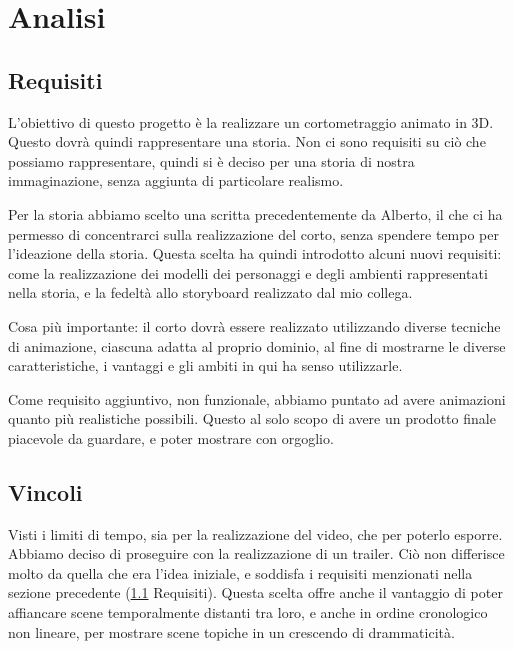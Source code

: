 
\chapter{Analisi} %

\label{Chapter2} %

\section{Requisiti} \label{req}
L'obiettivo di questo progetto è la realizzare un cortometraggio animato in 3D.
Questo dovrà quindi rappresentare una storia. Non ci sono requisiti su ciò che possiamo rappresentare, quindi si è deciso per una storia di nostra immaginazione, senza aggiunta di particolare realismo.

Per la storia abbiamo scelto una scritta precedentemente da Alberto, il che ci ha permesso di concentrarci sulla realizzazione del corto, senza spendere tempo per l'ideazione della storia. Questa scelta ha quindi introdotto alcuni nuovi requisiti: come la realizzazione dei modelli dei personaggi e degli ambienti rappresentati nella storia, e la fedeltà allo storyboard realizzato dal mio collega.

Cosa più importante: il corto dovrà essere realizzato utilizzando diverse tecniche di animazione, ciascuna adatta al proprio dominio, al fine di mostrarne le diverse caratteristiche, i vantaggi e gli ambiti in qui ha senso utilizzarle.

Come requisito aggiuntivo, non funzionale, abbiamo puntato ad avere animazioni quanto più realistiche possibili. Questo al solo scopo di avere un prodotto finale piacevole da guardare, e poter mostrare con orgoglio.

\section{Vincoli} 
Visti i limiti di tempo, sia per la realizzazione del video, che per poterlo esporre. Abbiamo deciso di proseguire con la realizzazione di un trailer. Ciò non differisce molto da quella che era l'idea iniziale, e soddisfa i requisiti menzionati nella sezione precedente (\ref{req} Requisiti). Questa scelta offre anche il vantaggio di poter affiancare scene temporalmente distanti tra loro, e anche in ordine cronologico non lineare, per mostrare scene topiche in un crescendo di drammaticità.


